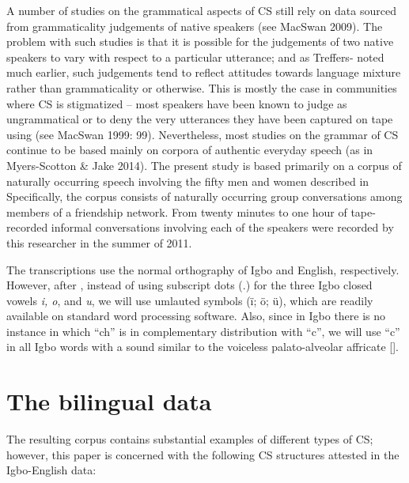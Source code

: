 \documentclass[output=paper]{langsci/langscibook}
\begin{document}
A number of studies on the grammatical aspects of CS still rely on data sourced from grammaticality judgements of native speakers (see MacSwan 2009). The problem with such studies is that it is possible for the judgements of two native speakers to vary with respect to a particular utterance; and as Treffers-\citet{Daller1991} noted much earlier, such judgements tend to reflect attitudes towards language mixture rather than grammaticality or otherwise. This is mostly the case in communities where CS is stigmatized – most speakers have been known to judge as ungrammatical or to deny the very utterances they have been captured on tape using (see MacSwan 1999: 99). Nevertheless, most studies on the grammar of CS continue to be based mainly on corpora of authentic everyday speech (as in Myers-Scotton \& Jake 2014). The present study is based primarily on a corpus of naturally occurring speech involving the fifty men and women described in  Specifically, the corpus consists of naturally occurring group conversations among members of a friendship network. From twenty minutes to one hour of tape-recorded informal conversations involving each of the speakers were recorded by this researcher in the summer of 2011. 

The transcriptions use the normal orthography of Igbo and English, respectively. However, after \citet{Echeruo1998}, instead of using subscript dots (.) for the three Igbo closed vowels \textit{i, o}, and \textit{u}, we will use umlauted symbols (ï; ö; \"{u}), which are readily available on standard word processing software. Also, since in Igbo there is no instance in which “ch” is in complementary distribution with “c”, we will use “c” in all Igbo words with a sound similar to the voiceless palato-alveolar affricate []. 

\section{The bilingual data}

The resulting corpus contains substantial examples of different types of CS; however, this paper is concerned with the following CS structures attested in the Igbo-English data:
\end{document}
